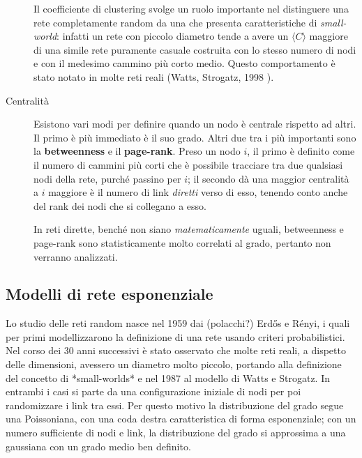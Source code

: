 \begin{description}
	Il coefficiente di clustering svolge un ruolo importante nel distinguere una rete completamente random da una che presenta caratteristiche di \emph{small-world}: infatti un rete con piccolo diametro tende a avere un $\langle C\rangle$ maggiore di una simile rete puramente casuale costruita con lo stesso numero di nodi e con il medesimo cammino più corto medio. Questo comportamento è stato notato in molte reti reali (Watts, Strogatz, 1998
).
	\item[Centralit\`a] Esistono vari modi per definire quando un nodo è centrale rispetto ad altri. Il primo è più immediato è il suo grado. Altri due tra i più importanti sono la \textbf{betweenness} e il \textbf{page-rank}. Preso un nodo $i$, il primo è definito come il numero di cammini più corti che è possibile tracciare tra due qualsiasi nodi della rete, purché passino per $i$; il secondo dà una maggior centralità a $i$ maggiore è il numero di link \emph{diretti} verso di esso, tenendo conto anche del rank dei nodi che si collegano a esso. 
	
	In reti dirette, benché non siano \emph{matematicamente} uguali, betweenness e page-rank sono statisticamente molto correlati al grado, pertanto non verranno analizzati. 
\end{description}

\subsection{Modelli di rete esponenziale }
Lo studio delle reti random nasce nel 1959 dai (polacchi?) Erdős e Rényi, i quali per primi modellizzarono la definizione di una rete usando criteri probabilistici. Nel corso dei 30 anni successivi è stato osservato che molte reti reali, a dispetto delle dimensioni, avessero un diametro molto piccolo, portando alla definizione del concetto di *small-worlds* e nel 1987 al modello di Watts e Strogatz.
In entrambi i casi si parte da una configurazione iniziale di nodi per poi randomizzare i link tra essi. Per questo motivo la distribuzione del grado segue una Poissoniana, con una coda destra caratteristica di forma esponenziale; con un numero sufficiente di nodi e link, la distribuzione del grado si approssima a una gaussiana con un grado medio ben definito.

